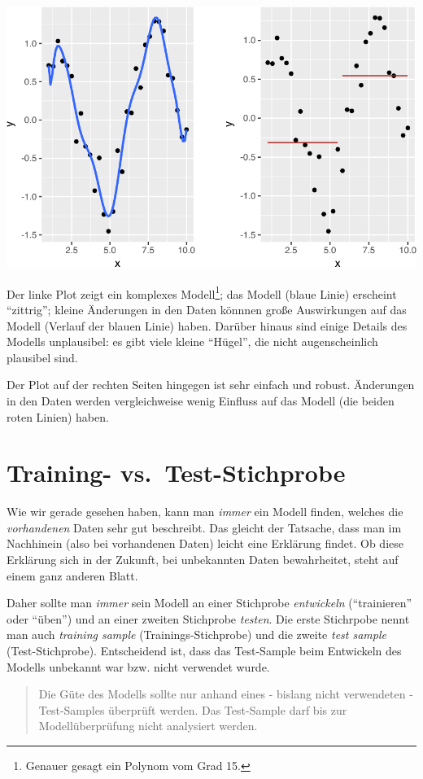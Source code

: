 \documentclass[12pt,]{book}
\let\rmarkdownfootnote\footnote%
\def\footnote{\protect\rmarkdownfootnote}
\begin{document}
\begin{center}\includegraphics[width=0.7\linewidth]{060_Modellieren_files/figure-latex/plot-bias-variance-1} \end{center}

Der linke Plot zeigt ein komplexes Modell\footnote{Genauer gesagt ein
  Polynom vom Grad 15.}; das Modell (blaue Linie) erscheint ``zittrig'';
kleine Änderungen in den Daten könnnen große Auswirkungen auf das Modell
(Verlauf der blauen Linie) haben. Darüber hinaus sind einige Details des
Modells unplausibel: es gibt viele kleine ``Hügel'', die nicht
augenscheinlich plausibel sind.

Der Plot auf der rechten Seiten hingegen ist sehr einfach und robust.
Änderungen in den Daten werden vergleichweise wenig Einfluss auf das
Modell (die beiden roten Linien) haben.

\section{Training-
vs.~Test-Stichprobe}\label{training--vs.test-stichprobe}

Wie wir gerade gesehen haben, kann man \emph{immer} ein Modell finden,
welches die \emph{vorhandenen} Daten sehr gut beschreibt. Das gleicht
der Tatsache, dass man im Nachhinein (also bei vorhandenen Daten) leicht
eine Erklärung findet. Ob diese Erklärung sich in der Zukunft, bei
unbekannten Daten bewahrheitet, steht auf einem ganz anderen Blatt.

Daher sollte man \emph{immer} sein Modell an einer Stichprobe
\emph{entwickeln} (``trainieren'' oder ``üben'') und an einer zweiten
Stichprobe \emph{testen}. Die erste Stichrpobe nennt man auch
\emph{training sample} (Trainings-Stichprobe) und die zweite \emph{test
sample} (Test-Stichprobe). Entscheidend ist, dass das Test-Sample beim
Entwickeln des Modells unbekannt war bzw. nicht verwendet wurde.

\begin{quote}
Die Güte des Modells sollte nur anhand eines - bislang nicht verwendeten
- Test-Samples überprüft werden. Das Test-Sample darf bis zur
Modellüberprüfung nicht analysiert werden.
\end{quote}
\end{document}

